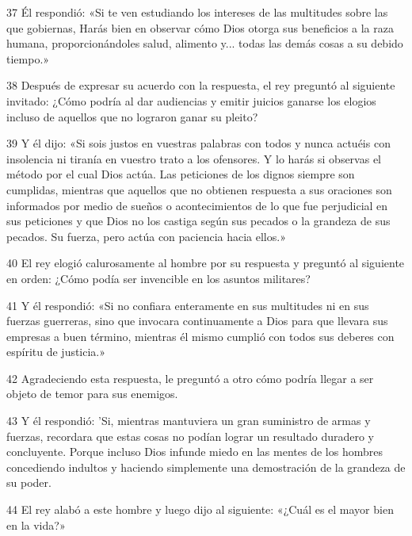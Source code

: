 \par 37 Él respondió: «Si te ven estudiando los intereses de las multitudes sobre las que gobiernas, Harás bien en observar cómo Dios otorga sus beneficios a la raza humana, proporcionándoles salud, alimento y... todas las demás cosas a su debido tiempo.»

\par 38 Después de expresar su acuerdo con la respuesta, el rey preguntó al siguiente invitado: ¿Cómo podría al dar audiencias y emitir juicios ganarse los elogios incluso de aquellos que no lograron ganar su pleito?

\par 39 Y él dijo: «Si sois justos en vuestras palabras con todos y nunca actuéis con insolencia ni tiranía en vuestro trato a los ofensores. Y lo harás si observas el método por el cual Dios actúa. Las peticiones de los dignos siempre son cumplidas, mientras que aquellos que no obtienen respuesta a sus oraciones son informados por medio de sueños o acontecimientos de lo que fue perjudicial en sus peticiones y que Dios no los castiga según sus pecados o la grandeza de sus pecados. Su fuerza, pero actúa con paciencia hacia ellos.»

\par 40 El rey elogió calurosamente al hombre por su respuesta y preguntó al siguiente en orden: ¿Cómo podía ser invencible en los asuntos militares?

\par 41 Y él respondió: «Si no confiara enteramente en sus multitudes ni en sus fuerzas guerreras, sino que invocara continuamente a Dios para que llevara sus empresas a buen término, mientras él mismo cumplió con todos sus deberes con espíritu de justicia.»

\par 42 Agradeciendo esta respuesta, le preguntó a otro cómo podría llegar a ser objeto de temor para sus enemigos.

\par 43 Y él respondió: 'Si, mientras mantuviera un gran suministro de armas y fuerzas, recordara que estas cosas no podían lograr un resultado duradero y concluyente. Porque incluso Dios infunde miedo en las mentes de los hombres concediendo indultos y haciendo simplemente una demostración de la grandeza de su poder.

\par 44 El rey alabó a este hombre y luego dijo al siguiente: «¿Cuál es el mayor bien en la vida?»

